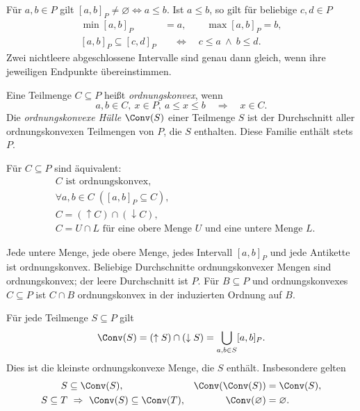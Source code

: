 \begin{theorem}
\label{b12guide:thm:interval}
Für $a,b\in P$ gilt
$[a,b]_P\ne\varnothing\Longleftrightarrow a\leq b$.
Ist $a\leq b$, so gilt für beliebige $c,d\in P$
\[
\begin{aligned}
 \min[a,b]_P&=a,\qquad \max[a,b]_P=b,\\
 [a,b]_P\subseteq[c,d]_P
 &\quad\Longleftrightarrow\quad c\leq a\ \land\ b\leq d.
\end{aligned}
\]
Zwei nichtleere abgeschlossene Intervalle sind genau dann gleich,
wenn ihre jeweiligen Endpunkte übereinstimmen.
\end{theorem}

\begin{definition}[Ordnungskonvexität]
\label{b12guide:def:convex}
Eine Teilmenge $C\subseteq P$ heißt \emph{ordnungskonvex}, wenn
\[
 a,b\in C,\ x\in P,\ a\leq x\leq b\quad\Longrightarrow\quad x\in C.
\]
Die \emph{ordnungskonvexe Hülle} $\Conv(S)$ einer Teilmenge $S$
ist der Durchschnitt aller ordnungskonvexen Teilmengen von $P$,
die $S$ enthalten. Diese Familie enthält stets $P$.
\end{definition}

\begin{theorem}
\label{b12guide:thm:convex-characterization}
Für $C\subseteq P$ sind äquivalent:
\[
\begin{aligned}
 &C\text{ ist ordnungskonvex},\\
 &\forall a,b\in C\;([a,b]_P\subseteq C),\\
 &C=(\uparrow C)\cap(\downarrow C),\\
 &C=U\cap L\text{ für eine obere Menge }U
                    \text{ und eine untere Menge }L.
\end{aligned}
\]
\end{theorem}

\begin{theorem}
\label{b12guide:thm:convex-intersections}
Jede untere Menge, jede obere Menge, jedes Intervall $[a,b]_P$
und jede Antikette ist ordnungskonvex. Beliebige Durchschnitte
ordnungskonvexer Mengen sind ordnungskonvex; der leere
Durchschnitt ist $P$. Für $B\subseteq P$ und ordnungskonvexes
$C\subseteq P$ ist $C\cap B$ ordnungskonvex in der induzierten
Ordnung auf $B$.
\end{theorem}

\begin{theorem}
\label{b12guide:thm:convex-hull}
Für jede Teilmenge $S\subseteq P$ gilt
\[
 \Conv(S)=(\uparrow S)\cap(\downarrow S)
          =\bigcup_{a,b\in S}[a,b]_P.
\]
Dies ist die kleinste ordnungskonvexe Menge, die $S$ enthält.
Insbesondere gelten
\[
\begin{aligned}
 S&\subseteq\Conv(S),& \Conv(\Conv(S))&=\Conv(S),\\
 S\subseteq T&\ \Rightarrow\ \Conv(S)\subseteq\Conv(T),&
 \Conv(\varnothing)&=\varnothing.
\end{aligned}
\]
\end{theorem}

